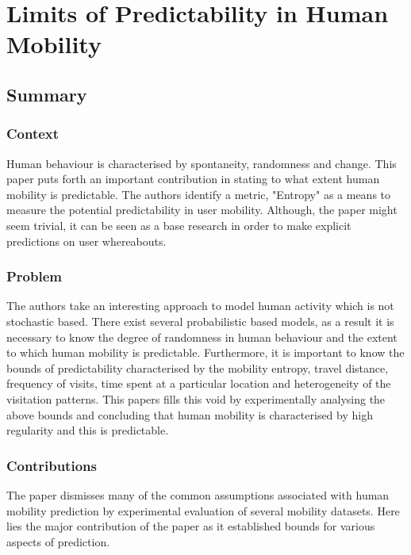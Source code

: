 \newpage
\section{Limits of Predictability in Human Mobility\cite{Song1018}} \label{lect2}

\subsection{Summary} \label{lect2-sum}

\subsubsection{Context}

Human behaviour is characterised by spontaneity, randomness and change. This paper puts
forth an important contribution in stating to what extent human mobility is predictable. 
The authors identify a metric, "Entropy" as a means to measure the potential predictability
in user mobility. Although, the paper might seem trivial, it can be seen as a base research
in order to make explicit predictions on user whereabouts. 

\subsubsection{Problem}

The authors take an interesting approach to model human activity which is not stochastic 
based. There exist several probabilistic based models, as a result it is necessary to 
know the degree of randomness in human behaviour and the extent to which human mobility 
is predictable. Furthermore, it is important to know the bounds of predictability 
characterised by the mobility entropy, travel distance, frequency of visits, time spent 
at a particular location and heterogeneity of the visitation patterns. This papers fills this
void by experimentally analysing the above bounds and concluding that human mobility is 
characterised by high regularity and this is predictable.          

\subsubsection{Contributions}

The paper dismisses many of the common assumptions associated with human mobility prediction
by experimental evaluation of several mobility datasets. Here lies the major contribution of 
the paper as it established bounds for various aspects of prediction. 

